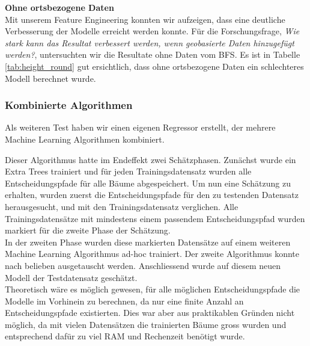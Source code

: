 \begin{table}[ht]
\centering
{}
\caption{Ergebnisse ohne ortsbezogenen Daten vom BFS}
\label{tab:height_round}
\end{table}

\textbf{Ohne ortsbezogene Daten}\\
Mit unserem Feature Engineering konnten wir aufzeigen, dass eine deutliche Verbesserung der Modelle erreicht werden konnte. Für die Forschungsfrage, \textit{Wie stark kann das Resultat verbessert werden, wenn geobasierte Daten hinzugefügt werden?}, untersuchten wir die Resultate ohne Daten vom BFS. Es ist in Tabelle \ref{tab:height_round} gut ersichtlich, dass ohne ortsbezogene Daten ein schlechteres Modell berechnet wurde.

\subsubsection{Kombinierte Algorithmen}
Als weiteren Test haben wir einen eigenen Regressor erstellt, der mehrere Machine Learning Algorithmen kombiniert.

Dieser Algorithmus hatte im Endeffekt zwei Schätzphasen. Zunächst wurde ein Extra Trees trainiert und für jeden Trainingsdatensatz wurden alle Entscheidungspfade für alle Bäume abgespeichert. Um nun eine Schätzung zu erhalten, wurden zuerst die Entscheidungspfade für den zu testenden Datensatz herausgesucht, und mit den Trainingsdatensatz verglichen. Alle Trainingsdatensätze mit mindestens einem passendem Entscheidungspfad wurden markiert für die zweite Phase der Schätzung.\\
In der zweiten Phase wurden diese markierten Datensätze auf einem weiteren Machine Learning Algorithmus ad-hoc trainiert. Der zweite Algorithmus konnte nach belieben ausgetauscht werden. Anschliessend wurde auf diesem neuen Modell der Testdatensatz geschätzt.\\
Theoretisch wäre es möglich gewesen, für alle möglichen Entscheidungspfade die Modelle im Vorhinein zu berechnen, da nur eine finite Anzahl an Entscheidungspfade existierten. Dies war aber aus praktikablen Gründen nicht möglich, da mit vielen Datensätzen die trainierten Bäume gross wurden und entsprechend dafür zu viel RAM und Rechenzeit benötigt wurde.

